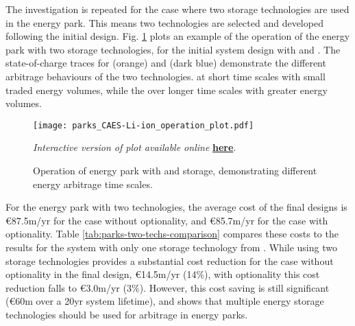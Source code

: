 The investigation is repeated for the case where two storage technologies are used in the energy park. This means two technologies are selected and developed following the initial design. Fig. \ref{fig:parks-op-sim} plots an example of the operation of the energy park with two storage technologies, for the initial system design with  and . The state-of-charge traces for  (orange) and  (dark blue) demonstrate the different arbitrage behaviours of the two technologies.
  at short time scales with small traded energy volumes, while the   over longer time scales with greater energy volumes.\\

\begin{figure}[h]
    \centering
    \hspace*{-0.5cm}\texttt{[image: parks\_CAES-Li-ion\_operation\_plot.pdf]}
    \caption{Operation of energy park with  and  storage, demonstrating different energy arbitrage time scales.}
    \label{fig:parks-op-sim}
    \vspace{0.1cm}
    \footnotesize{\textit{Interactive version of plot available online} \href{https://mal84emma.github.io/Energy-Park-Design/CAES-Li-ion_operation_plot.html}{\textbf{here}}.}
\end{figure}


\newpage
For the energy park with two technologies, the average cost of the final designs is {\euro}87.5m/yr for the case without optionality, and {\euro}85.7m/yr for the case with optionality.
Table \ref{tab:parks-two-techs-comparison} compares these costs to the results for the system with only one storage technology from . While using two storage technologies provides a substantial cost reduction for the case without optionality in the final design, {\euro}14.5m/yr (14\%), with optionality this cost reduction falls to {\euro}3.0m/yr (3\%). However, this cost saving is still significant ({\euro}60m over a 20yr system lifetime), and shows that multiple energy storage technologies should be used for arbitrage in energy parks.\\

